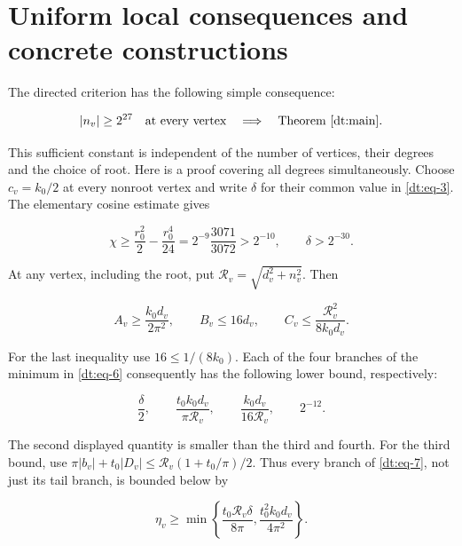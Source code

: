 \section{Uniform local consequences and concrete constructions}\label{dt:sec-8}

The directed criterion has the following simple consequence:

\begin{equation}\label{dt:eq-47}
|n_v|\ge2^{27}\quad\text{at every vertex}
             \quad\Longrightarrow\quad\text{Theorem~\ref{dt:main}}.
\end{equation}

This sufficient constant is independent of the number of vertices,
their degrees and the choice of root. Here is a proof covering all
degrees simultaneously. Choose \(c_v=k_0/2\) at every nonroot vertex
and write \(\delta\) for their common value in \eqref{dt:eq-3}. The elementary
cosine estimate gives

\begin{equation}\label{dt:eq-48}
\chi\ge\frac{r_0^2}{2}-\frac{r_0^4}{24}
       =2^{-9}\frac{3071}{3072}>2^{-10},\qquad
                          \delta>2^{-30}.
\end{equation}

At any vertex, including the root, put
\(\mathcal R_v=\sqrt{d_v^2+n_v^2}\). Then

\begin{equation}\label{dt:eq-49}
A_v\ge\frac{k_0d_v}{2\pi^2},\qquad B_v\le16d_v,
 \qquad C_v\le\frac{\mathcal R_v^2}{8k_0d_v}.
\end{equation}

For the last inequality use \(16\le1/(8k_0)\). Each of the four
branches of the minimum in \eqref{dt:eq-6} consequently has the following lower
bound, respectively:

\begin{equation}\label{dt:eq-50}
\frac\delta2,\qquad
 \frac{t_0k_0d_v}{\pi\mathcal R_v},\qquad
 \frac{k_0d_v}{16\mathcal R_v},\qquad 2^{-12}.
\end{equation}

The second displayed quantity is smaller than the third and fourth.
For the third bound, use
\(\pi|b_v|+t_0|D_v|\le\mathcal R_v(1+t_0/\pi)/2\).
Thus every branch of \eqref{dt:eq-7}, not just its tail branch, is bounded below by

\begin{equation}\label{dt:eq-51}
\eta_v\ge\min\left\{
       \frac{t_0\mathcal R_v\delta}{8\pi},
       \frac{t_0^2 k_0d_v}{4\pi^2}\right\}.
\end{equation}

